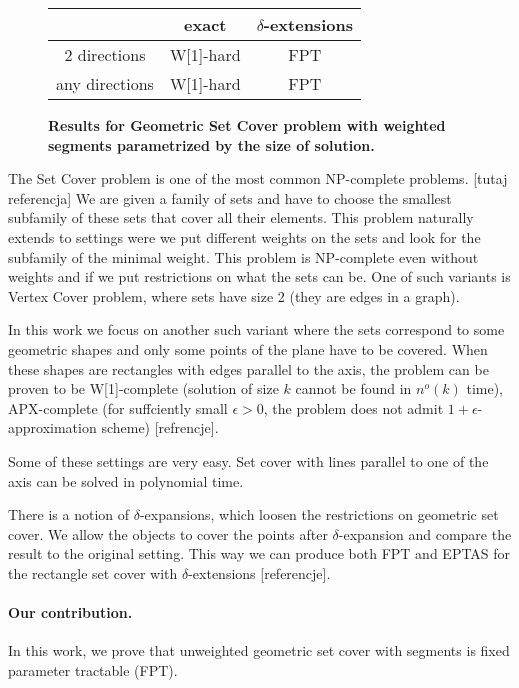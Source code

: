 \begin{figure}[h]
\begin{center}
\begin{tabular}{ | c | c | c | }
\hline
                & exact     & $\delta$-extensions \\ 
\hline                
 2 directions   & W[1]-hard & FPT \\  
\hline                
 any directions & W[1]-hard & FPT \\
\hline                
\end{tabular}
\caption{\textbf{Results for Geometric Set Cover problem with weighted segments 
parametrized by the size of solution.}}

\label{tab:weighted_fpt}
\end{center}
\end{figure}


The Set Cover problem is one of the most common NP-complete problems.
[tutaj referencja]
We are given a family of sets and have to choose the smallest
subfamily of these sets that cover all their elements.
This problem naturally extends to settings
were we put different weights on the sets
and look for the subfamily of the minimal weight.
This problem is NP-complete even 
without weights and if we put
restrictions on what the sets can be.
One of such variants is Vertex Cover problem,
where sets have size 2 (they are edges in a graph).

In this work we focus on another such variant where the sets correspond
to some geometric shapes and
only some points of the plane have to be covered.
When these shapes are rectangles with edges parallel
to the axis, the problem can be proven to
be W[1]-complete (solution of size $k$ cannot be found
in $n^o(k)$ time),
APX-complete (for suffciently small $\epsilon > 0$, the problem
does not admit $1+\epsilon$-approximation scheme)
[refrencje].

Some of these settings are very easy.
Set cover with lines parallel to one of the axis
can be solved in polynomial time.

There is a notion of $\delta$-expansions,
which loosen the restrictions on geometric set cover.
We allow the objects to cover the points
after $\delta$-expansion and compare
the result to the original setting.
This way we can produce both FPT and EPTAS
for the rectangle set cover with $\delta$-extensions
[referencje].



\paragraph{Our contribution.}
In this work, we prove that unweighted geometric set cover
with segments is fixed parameter tractable (FPT).

